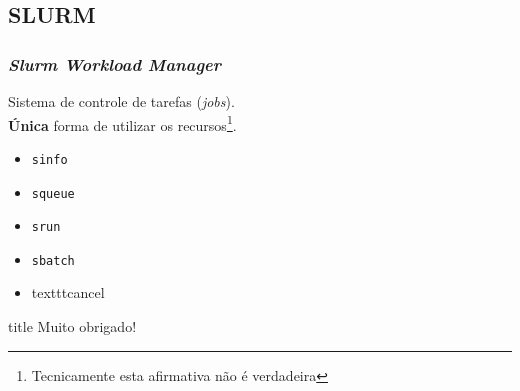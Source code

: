 \documentclass[svgnames,smaller,table]{beamer}
\begin{document}
\subsection{SLURM}
\begin{frame}
  \frametitle{\textit{Slurm Workload Manager}}
  \textbullet Sistema de controle de tarefas (\textit{jobs}).\\
  \vspace{0.2cm}
  \textbullet \alert{\textbf{Única}} forma de utilizar os recursos\footnote[frame]{Tecnicamente esta afirmativa não é verdadeira}.\\
  \vspace{0.2cm}
  \begin{itemize}
    \item \texttt{sinfo}
    \item \texttt{squeue}
    \item \texttt{srun}
    \item \texttt{sbatch}
    \item texttt{cancel}
  \end{itemize}
\end{frame}

\begin{frame}
 \vfill
  \begin{beamercolorbox}[center]{title}
     \Huge{Muito obrigado!}
  \end{beamercolorbox}
  \vfill

\end{frame}
\end{document}

